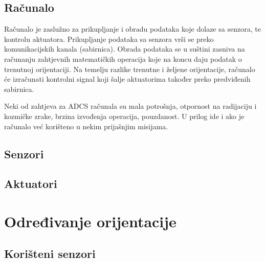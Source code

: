 \documentclass[times, utf8, diplomski, numeric]{templates/template}
\begin{document}
{{        \subsection{Računalo}{
            Računalo je zaslužno za prikupljanje i obradu podataka koje dolaze sa senzora, te kontrolu aktuatora. Prikupljanje podataka sa senzora vrši se preko komunikacijskih kanala (sabirnica). Obrada podataka se u suštini zasniva na računanju zahtjevnih matematičkih operacija koje na koncu daju podatak o trenutnoj orijentaciji. Na temelju razlike trenutne i željene orijentacije, računalo će izračunati kontrolni signal koji šalje aktuatorima također preko predviđenih sabirnica. 

            Neki od zahtjeva za ADCS računala su mala potrošnja, otpornost na radijaciju i kozmičke zrake, brzina izvođenja operacija, pouzdanost. U prilog ide i ako je računalo već korišteno u nekim prijašnjim misijama.
        }

        \subsection{Senzori}{
        }

        \subsection{Aktuatori}{
        }
    }

    \section{Određivanje orijentacije}{
        \subsection{Korišteni senzori}{
        }

}}
\end{document}
